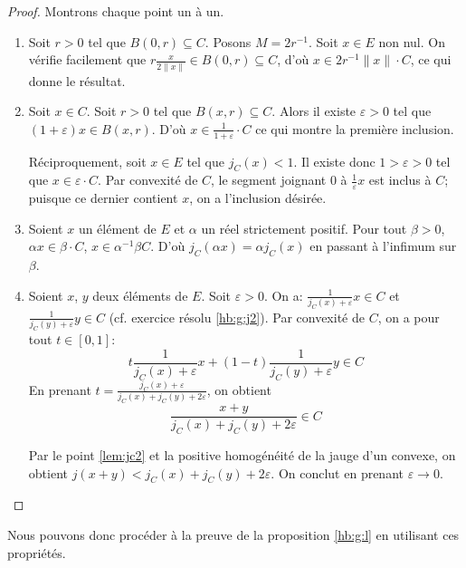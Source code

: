 \begin{proof}
  Montrons chaque point un à un.
  \begin{enumerate}
  \item Soit $r>0$ tel que $B(0, r)\subseteq C$. Posons
    $M = 2r^{-1}$. Soit $x\in E$ non nul. On vérifie facilement
    que $r\frac{x}{2\|x\|}\in B(0, r)\subseteq C$, d'où $x \in
    2r^{-1}\|x\|\cdot C$, ce qui donne le résultat.
  \item Soit $x\in C$. Soit $r> 0$ tel que $B(x, r)\subseteq C$.
    Alors il existe $\varepsilon >0$ tel que $(1+\varepsilon)x\in
    B(x, r)$. D'où $x\in \frac{1}{1+\varepsilon}\cdot C$ ce qui
    montre la première inclusion.

    Réciproquement, soit $x\in E$ tel que $j_C(x)<1$. Il existe
    donc $1 > \varepsilon > 0$ tel que $x\in \varepsilon \cdot C$.
    Par convexité de $C$, le segment joignant $0$ à
    $\frac{1}{\varepsilon}x$ est inclus à $C$; puisque
    ce dernier contient $x$, on a l'inclusion désirée.
  \item Soient $x$ un élément de $E$ et $\alpha$ un réel strictement
    positif. Pour tout $\beta > 0$, $\alpha x\in \beta\cdot C$, \ssi{}
    $x\in \alpha^{-1}\beta C$. D'où $j_C(\alpha x) = \alpha j_C(x)$ en
    passant à l'infimum sur $\beta$.
  \item Soient $x$, $y$  deux éléments de $E$. Soit
    $\varepsilon>0$. On a:%
    $\frac{1}{j_C(x)+\varepsilon}x\in C$ et
    $\frac{1}{j_C(y)+\varepsilon}y\in C$ (cf. exercice résolu \ref{hb:g:j2}).
    Par convexité de $C$, on a pour tout $t\in [0, 1]$:
    $$t\frac{1}{j_C(x)+\varepsilon}x +
    (1-t)\frac{1}{j_C(y)+\varepsilon}y\in C$$
    En prenant $\displaystyle{t = \frac{j_C(x)+\varepsilon}
      {j_C(x) +j_C(y)+2\varepsilon}}$, on obtient
    $$\frac{x+y}{j_C(x) +j_C(y)+2\varepsilon}\in C $$

    Par le point \ref{lem:jc2} et la positive homogénéité de la jauge d'un convexe,
    on obtient $j(x + y) < j_C(x)+j_C(y)+2\varepsilon$. On conclut
    en prenant $\varepsilon \to 0$.
  \end{enumerate}
\end{proof}

Nous pouvons donc procéder à la preuve de la proposition \ref{hb:g:l}
en utilisant ces propriétés.

